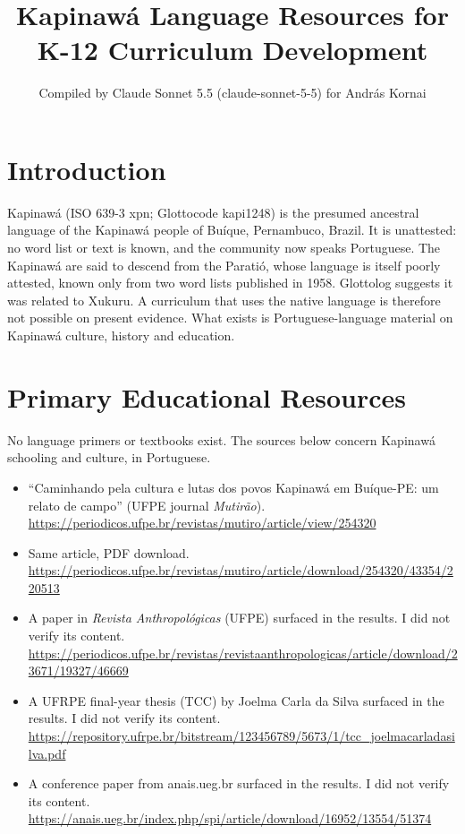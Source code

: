 \documentclass[12pt]{article}
\title{Kapinaw\'a Language Resources for K-12 Curriculum Development}
\author{Compiled by Claude Sonnet 5.5 (claude-sonnet-5-5) for Andr\'as Kornai}
\date{}
\begin{document}
\maketitle

\section{Introduction}
Kapinaw\'a (ISO 639-3 xpn; Glottocode kapi1248) is the presumed ancestral language of the Kapinaw\'a people of Bu\'ique, Pernambuco, Brazil. It is unattested: no word list or text is known, and the community now speaks Portuguese. The Kapinaw\'a are said to descend from the Parati\'o, whose language is itself poorly attested, known only from two word lists published in 1958. Glottolog suggests it was related to Xukuru. A curriculum that uses the native language is therefore not possible on present evidence. What exists is Portuguese-language material on Kapinaw\'a culture, history and education.

\section{Primary Educational Resources}
No language primers or textbooks exist. The sources below concern Kapinaw\'a schooling and culture, in Portuguese.
\begin{itemize}
\item ``Caminhando pela cultura e lutas dos povos Kapinaw\'a em Bu\'ique-PE: um relato de campo'' (UFPE journal \emph{Mutir\~ao}). \url{https://periodicos.ufpe.br/revistas/mutiro/article/view/254320}
\item Same article, PDF download. \url{https://periodicos.ufpe.br/revistas/mutiro/article/download/254320/43354/220513}
\item A paper in \emph{Revista Anthropol\'ogicas} (UFPE) surfaced in the results. I did not verify its content. \url{https://periodicos.ufpe.br/revistas/revistaanthropologicas/article/download/23671/19327/46669}
\item A UFRPE final-year thesis (TCC) by Joelma Carla da Silva surfaced in the results. I did not verify its content. \url{https://repository.ufrpe.br/bitstream/123456789/5673/1/tcc_joelmacarladasilva.pdf}
\item A conference paper from anais.ueg.br surfaced in the results. I did not verify its content. \url{https://anais.ueg.br/index.php/spi/article/download/16952/13554/51374}
\end{itemize}
\end{document}
